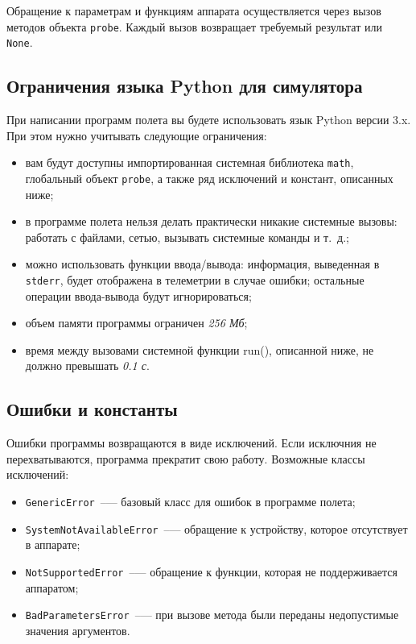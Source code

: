\documentclass[12pt,a4paper]{article}
\begin{document}
Обращение к параметрам и функциям аппарата осуществляется через вызов методов объекта
\verb'probe'. Каждый вызов возвращает требуемый результат или \verb'None'.

\subsection*{Ограничения языка Python для симулятора}

При написании программ полета вы будете использовать язык Python версии 3.x. При этом
нужно учитывать следующие ограничения:

\begin{itemize}
  \item вам будут доступны импортированная системная библиотека \verb'math', глобальный
    объект \verb'probe', а также ряд исключений и констант, описанных ниже;
  \item в программе полета нельзя делать практически никакие системные вызовы: работать с
    файлами, сетью, вызывать системные команды и т. д.;
  \item можно использовать функции ввода/вывода: информация, выведенная в \verb'stderr', будет
    отображена в телеметрии в случае ошибки; остальные операции ввода-вывода будут
    игнорироваться;
  \item объем памяти программы ограничен \emph{256 Мб};
  \item время между вызовами системной функции run(), описанной ниже, не должно превышать
    \emph{0.1 с}.
\end{itemize}

\subsection*{Ошибки и константы}

Ошибки программы возвращаются в виде исключений. Если исключния не перехватываются,
программа прекратит свою работу. Возможные классы исключений:

\begin{itemize}
\item \verb'GenericError'~--— базовый класс для ошибок в программе полета;
\item \verb'SystemNotAvailableError'~--— обращение к устройству, которое отсутствует в
  аппарате;

\item \verb'NotSupportedError'~--— обращение к функции, которая не поддерживается аппаратом;
\item \verb'BadParametersError'~--— при вызове метода были переданы недопустимые значения аргументов.
\end{itemize}
\end{document}

